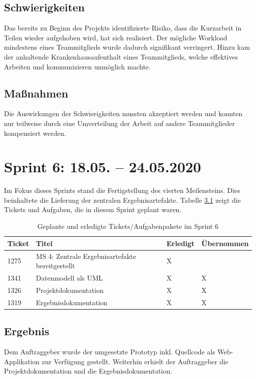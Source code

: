 \documentclass[a4paper,11pt,listof=numbered,glossary=totoc,parskip=half,toc=bib]{scrreprt}
\begin{document}
    \section{Schwierigkeiten}
    Das bereits zu Beginn des Projekts identifizierte Risiko, dass die Kurzarbeit in Teilen wieder aufgehoben wird, hat sich realisiert. Der mögliche Workload mindestens eines Teammitglieds wurde dadurch signifikant verringert. Hinzu kam der anhaltende Krankenhausaufenthalt eines Teammitglieds, welche effektives Arbeiten und kommunizieren unmöglich machte.
    
    \section{Maßnahmen}
    Die Auswirkungen der Schwierigkeiten mussten akzeptiert werden und konnten nur teilweise durch eine Umverteilung der Arbeit auf andere Teammitglieder kompensiert werden.
    
    \chapter{Sprint 6: 18.05. – 24.05.2020}
    
    Im Fokus dieses Sprints stand die Fertigstellung des vierten Meilensteins. Dies beinhaltete die Lieferung der zentralen Ergebnisartefakte. Tabelle \ref{tab:sprint6} zeigt die Tickets und Aufgaben, die in diesem Sprint geplant waren.
    
\begin{table}    
    \begin{tabularx}{\textwidth}{lXll}
			\toprule
			\textbf{Ticket} & \textbf{Titel} & \textbf{Erledigt} & \textbf{Übernommen} \\
			\midrule
1275	&	MS 4: Zentrale Ergebnisartefakte bereitgestellt	&	X	&		\\
1341	&	Datenmodell als UML	&	X	&	X	\\
1326	&	Projektdokumentation	&	X	&	X	\\
1319	&	Ergebnisdokumentation	&	X	&	X	\\

			\bottomrule
		\end{tabularx}
\caption{Geplante und erledigte Tickets/Aufgabenpakete im Sprint 6}
\label{tab:sprint6}
\end{table}
    
    \section{Ergebnis}
    Dem Auftraggeber wurde der umgesetzte Prototyp inkl. Quellcode als Web-Applikation zur Verfügung gestellt. Weiterhin erhielt der Auftraggeber die Projektdokumentation und die Ergebnisdokumentation.
    
\end{document}
